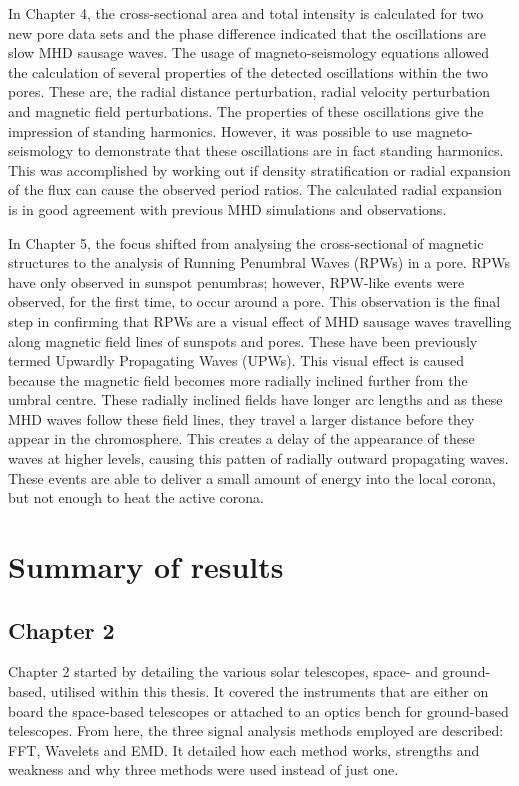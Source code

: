     In Chapter 4, the cross-sectional area and total intensity is calculated for two new pore data sets and the phase difference indicated that the oscillations are slow MHD sausage waves.
    The usage of magneto-seismology equations allowed the calculation of several properties of the detected oscillations within the two pores.
    These are, the radial distance perturbation, radial velocity perturbation and magnetic field perturbations.
    The properties of these oscillations give the impression of standing harmonics.
    However, it was possible to use magneto-seismology to demonstrate that these oscillations are in fact standing harmonics.
    This was accomplished by working out if density stratification or radial expansion of the flux can cause the observed period ratios.
    The calculated radial expansion is in good agreement with previous MHD simulations and observations. 
    
    In Chapter 5, the focus shifted from analysing the cross-sectional of magnetic structures to the analysis of Running Penumbral Waves (RPWs) in a pore.
    RPWs have only observed in sunspot penumbras; however, RPW-like events were observed, for the first time, to occur around a pore.
    This observation is the final step in confirming that RPWs are a visual effect of MHD sausage waves travelling along magnetic field lines of sunspots and pores.
    These have been previously termed Upwardly Propagating Waves (UPWs).
    This visual effect is caused because the magnetic field becomes more radially inclined further from the umbral centre.
    These radially inclined fields have longer arc lengths and as these MHD waves follow these field lines, they travel a larger distance before they appear in the chromosphere.
    This creates a delay of the appearance of these waves at higher levels, causing this patten of radially outward propagating waves.
    These events are able to deliver a small amount of energy into the local corona, but not enough to heat the active corona.
       
\section{Summary of results}

	\subsection{Chapter 2}

    Chapter 2 started by detailing the various solar telescopes, space- and ground-based, utilised within this thesis.
    It covered the instruments that are either on board the space-based telescopes or attached to an optics bench for ground-based telescopes.
    From here, the three signal analysis methods employed are described: FFT, Wavelets and EMD.
    It detailed how each method works, strengths and weakness and why three methods were used instead of just one.
    
